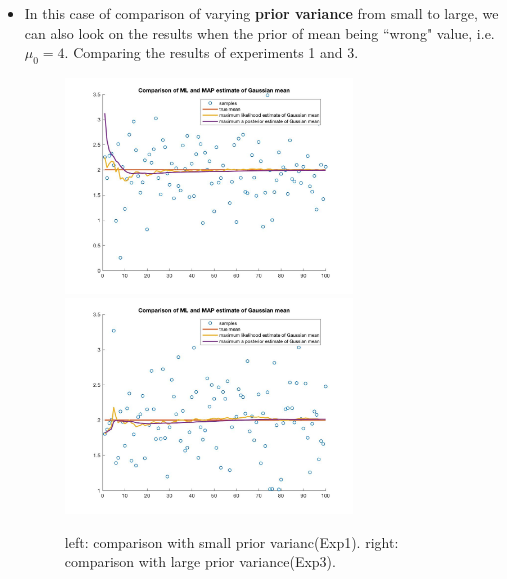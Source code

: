 \documentclass[a4paper]{article}
\begin{document}
\begin{spacing}{2.0}
\begin{itemize}
\item In this case of comparison of varying \textbf{prior variance} from small to large, we can also look on the results when the prior of mean being  ``wrong" value, i.e. $\mu_0 =4$. Comparing the results of experiments 1 and 3. 
\begin{figure}[H]
	\centering
	\includegraphics[width=3in]{100comparison1.jpg}
	\includegraphics[width=3in]{100comparison3.jpg}
	\caption{left: comparison with small prior varianc(Exp1). right: comparison with large prior variance(Exp3).}
	\label{fig:side:b}
\end{figure}


\end{itemize}
\end{spacing}
\end{document}

